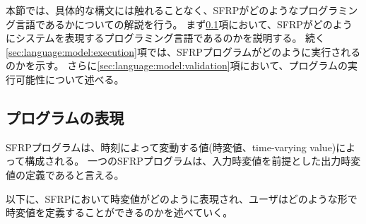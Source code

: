 本節では、具体的な構文には触れることなく、SFRPがどのようなプログラミング言語であるかについての解説を行う。
まず\ref{sec:language:model:program}項において、SFRPがどのようにシステムを表現するプログラミング言語であるのかを説明する。
続く\ref{sec:language:model:execution}項では、SFRPプログラムがどのように実行されるのかを示す。
さらに\ref{sec:language:model:validation}項において、プログラムの実行可能性について述べる。

\subsection{プログラムの表現}\label{sec:language:model:program}
SFRPプログラムは、時刻によって変動する値(時変値、time-varying value)によって構成される。
一つのSFRPプログラムは、入力時変値を前提とした出力時変値の定義であると言える。

以下に、SFRPにおいて時変値がどのように表現され、ユーザはどのような形で時変値を定義することができるのかを述べていく。

